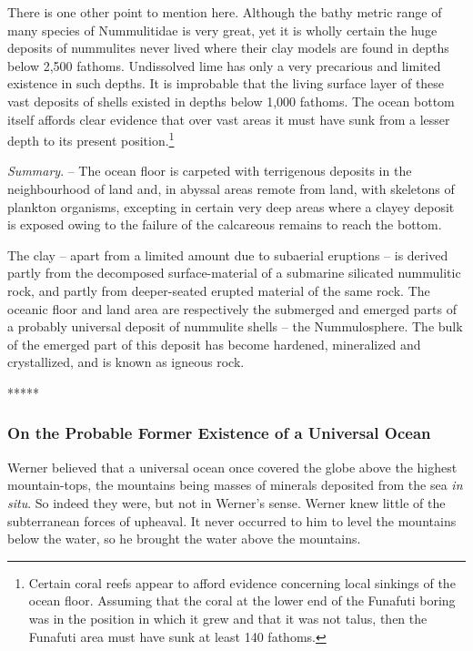 \documentclass[a4paper, 12pt, oneside]{article}
\begin{document}
There is one other point to mention here. Although the bathy metric range of many species of Nummulitidae is very great, yet it is wholly certain the huge deposits of nummulites never lived where their clay models are found in depths below 2,500 fathoms. Undissolved lime has only a very precarious and limited existence in such depths. It is improbable that the living surface layer of these vast deposits of shells existed in depths below 1,000 fathoms. The ocean bottom itself affords clear evidence that over vast areas it must have sunk from a lesser depth to its present position.\footnote{Certain coral reefs appear to afford evidence concerning local sinkings of the ocean floor. Assuming that the coral at the lower end of the Funafuti boring was in the position in which it grew and that it was not talus, then the Funafuti area must have sunk at least 140 fathoms.} 

\emph{Summary}. -- The ocean floor is carpeted with terrigenous deposits in the neighbourhood of land and, in abyssal areas remote from land, with skeletons of plankton organisms, excepting in certain very deep areas where a clayey deposit is exposed owing to the failure of the calcareous remains to reach the bottom.

The clay -- apart from a limited amount due to subaerial eruptions -- is derived partly from the decomposed surface-material of a submarine silicated nummulitic rock, and partly from deeper-seated erupted material of the same rock. The oceanic floor and land area are respectively the submerged and emerged parts of a probably universal deposit of nummulite shells -- the Nummulosphere. The bulk of the emerged part of this deposit has become hardened, mineralized and crystallized, and is known as igneous rock.

\centerline{*\hspace{15mm}*\hspace{15mm}*\hspace{15mm}*\hspace{15mm}*}
\bigskip
\subsubsection{On the Probable Former Existence of a Universal Ocean}

Werner believed that a universal ocean once covered the globe above the highest mountain-tops, the mountains being masses of minerals deposited from the sea \emph{in situ}. So indeed they were, but not in Werner's sense. Werner knew little of the subterranean forces of upheaval. It never occurred to him to level the mountains below the water, so he brought the water above the mountains.
\end{document}
